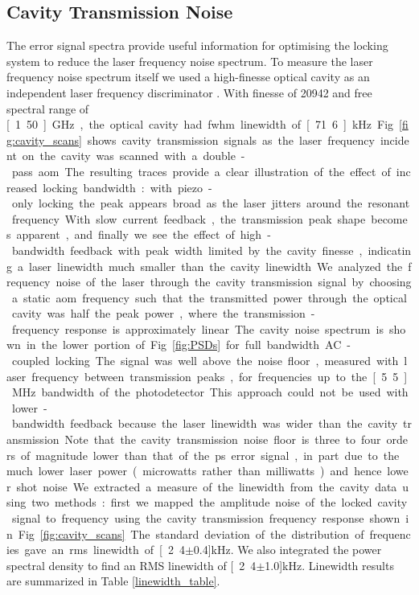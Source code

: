 \subsection{Cavity Transmission Noise}
The error signal spectra provide useful information for optimising the locking system to reduce the laser frequency noise spectrum.
To measure the laser frequency noise spectrum itself we used a high-finesse optical cavity as an independent laser frequency discriminator \cite{equipment}.
With finesse of 20942 and free spectral range of \unit[1.50]{GHz}, the optical cavity had \gls*{fwhm} linewidth of \unit[71.6]{kHz}.
Fig.~\ref{fig:cavity_scans} shows cavity transmission signals as the laser frequency incident on the cavity was scanned with a double-pass \gls*{aom}.
The resulting traces provide a clear illustration of the effect of increased locking bandwidth: with piezo-only locking the peak appears broad as the laser jitters around the resonant frequency.
With slow current feedback, the transmission peak shape becomes apparent, and finally we see the effect of high-bandwidth feedback with peak width limited by the cavity finesse, indicating a laser linewidth much smaller than the cavity linewidth.

We analyzed the frequency noise of the laser through the cavity transmission signal by choosing a static \gls*{aom} frequency such that the transmitted power through the optical cavity was half the peak power, where the transmission-frequency response is approximately linear. 

The cavity noise spectrum is shown in the lower portion of Fig.~\ref{fig:PSDs} for full bandwidth AC-coupled locking.
The signal was well above the noise floor, measured with laser frequency between transmission peaks, for frequencies up to the \unit[5.5]{MHz} bandwidth of the photodetector.
 This approach could not be used with lower-bandwidth feedback because the laser linewidth was wider than the cavity transmission.
 Note that the cavity transmission noise floor is three to four orders of magnitude lower than that of the \gls*{ps} error signal, in part due to the much lower laser power (microwatts rather than milliwatts) and hence lower shot noise.

We extracted a measure of the linewidth from the cavity data using two methods: first we mapped the amplitude noise of the locked cavity signal to frequency using the cavity transmission frequency response shown in Fig.~\ref{fig:cavity_scans}.
The standard deviation of the distribution of frequencies gave an \gls*{rms} linewidth of \unit[2.4$\pm$0.4]{kHz}.
We also integrated the power spectral density to find an RMS linewidth \cite{negnevitsky_wideband_2013} of \unit[2.4$\pm$1.0]{kHz}.
Linewidth results are summarized in Table \ref{linewidth_table}.

